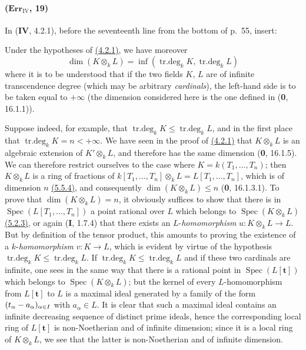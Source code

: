 \paragraph{($\mathbf{Err}_{\mathrm{IV}}$, 19)}
In (\textbf{IV}, 4.2.1), before the seventeenth line from the bottom of p.~55,
insert:

\begin{remark}[4.2.1.4]
\label{IV.4.2.1.4}
Under the hypotheses of {\hyperref[IV.4.2.1]{(4.2.1)}}, we have
moreover
\begin{equation}
 \dim(K\otimes_kL)=
 \inf(\operatorname{tr.deg}_kK,\operatorname{tr.deg}_kL)
 \label{IV.4.2.1.5}\tag{4.2.1.5}
\end{equation}
where it is to be understood that if the two fields $K$, $L$ are of infinite
transcendence degree (which may be arbitrary \emph{cardinals}), the
left-hand side is to be taken equal to $+\infty$ (the dimension considered
here is the one defined in (\textbf{0}, 16.1.1)).

Suppose indeed, for example, that
$\operatorname{tr.deg}_kK\leq\operatorname{tr.deg}_kL$, and in the first
place that $\operatorname{tr.deg}_kK=n<+\infty$. We have seen in the proof
of {\hyperref[IV.4.2.1]{(4.2.1)}} that $K\otimes_kL$ is an
algebraic extension of $K'\otimes_kL$, and therefore has the same dimension
(\textbf{0}, 16.1.5). We can therefore restrict ourselves to the case where
$K=k(T_1,\ldots,T_n)$; then $K\otimes_kL$ is a ring of fractions
of
$k[T_1,\ldots,T_n]\otimes_kL=L[T_1,\ldots,T_n]$,
which is of dimension $n$ {\hyperref[IV.5.5.4]{(5.5.4)}}, and
consequently $\dim(K\otimes_kL)\leq n$ (\textbf{0}, 16.1.3.1). To prove that
$\dim(K\otimes_kL)=n$, it obviously suffices to show that there is in
$\operatorname{Spec}(L[T_1,\ldots,T_n])$ a point rational over $L$
which belongs to $\operatorname{Spec}(K\otimes_kL)$
{\hyperref[IV.5.2.3]{(5.2.3)}}, or again (\textbf{I}, 1.7.4) that there
exists an $L$-\emph{homomorphism} $u:K\otimes_kL\to L$. But by definition
of the tensor product, this amounts to proving the existence of a
$k$-\emph{homomorphism} $v:K\to L$, which is evident by virtue of
the hypothesis
$\operatorname{tr.deg}_kK\leq\operatorname{tr.deg}_kL$.
If $\operatorname{tr.deg}_kK\leq\operatorname{tr.deg}_kL$ and if these
two cardinals are infinite, one sees in the same way that there is a
rational point in $\operatorname{Spec}(L[\mathbf{t}])$ which
belongs to $\operatorname{Spec}(K\otimes_kL)$; but the kernel of every
$L$-homomorphism from $L[\mathbf{t}]$ to $L$ is a
maximal ideal generated by a family of the form
$(t_\alpha- a_\alpha)_{\alpha\in I}$ with $a_\alpha\in L$. It is clear
that such a maximal ideal contains an infinite decreasing sequence
of distinct prime ideals, hence the corresponding local ring of
$L[\mathbf{t}]$ is non-Noetherian and of infinite
dimension; since it is a local ring of $K\otimes_kL$, we
see that the latter is non-Noetherian and of infinite dimension.
\end{remark}

